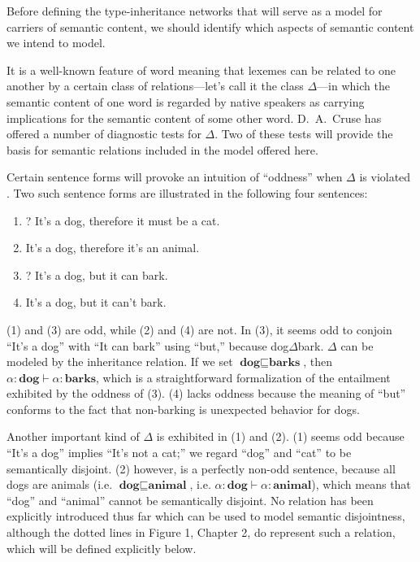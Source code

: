 Before defining the type-inheritance networks that will serve as a model for carriers of semantic content, we should identify which aspects of semantic content we intend to model.

It is a well-known feature of word meaning that lexemes can be related to one another by a certain  class of relations---let's call it the class $\Delta$---in which the semantic content of one word is regarded by native speakers as carrying implications for the semantic content of some other word. D.\ A.\ Cruse has offered a number of diagnostic tests for $\Delta$. Two of these tests will provide the basis for semantic relations included in the model offered here.

Certain sentence forms will provoke an intuition of ``oddness'' when $\Delta$ is violated \cite{cruse_lexical_1986}. Two such sentence forms are illustrated in the following four sentences:
\begin{enumerate}[(1)]
\item ? It's a dog, therefore it must be a cat.
\item It's a dog, therefore it's an animal.
\item ? It's a dog, but it can bark.
\item It's a dog, but it can't bark.
\end{enumerate}
(1) and (3) are odd, while (2) and (4) are not. In (3), it seems odd to conjoin ``It's a dog'' with ``It can bark'' using ``but,'' because dog$\Delta$bark. $\Delta$ can be modeled by the inheritance relation. If we set $\textbf{dog}\sqsubseteq\textbf{barks}$, then $\alpha:\textbf{dog}\vdash\alpha:\textbf{barks}$, which is a straightforward formalization of the entailment exhibited by the oddness of (3). (4) lacks oddness because the meaning of ``but'' conforms to the fact that non-barking is unexpected behavior for dogs.

Another important kind of $\Delta$ is exhibited in (1) and (2). (1) seems odd because ``It's a dog'' implies ``It's not a cat;'' we regard ``dog'' and ``cat'' to be semantically disjoint. (2) however, is a perfectly non-odd sentence, because all dogs are animals (i.e. $\textbf{dog}\sqsubseteq\textbf{animal}$, i.e. $\alpha:\textbf{dog}\vdash\alpha:\textbf{animal}$), which means that ``dog'' and ``animal'' cannot be semantically disjoint. No relation has been explicitly introduced thus far which can be used to model semantic disjointness, although the dotted lines in Figure 1, Chapter 2, do represent such a relation, which will be defined explicitly below.

